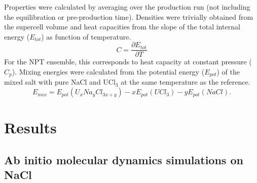 \documentclass[titlepage=firstiscover,11pt,fleqn,headheight=14pt,footheight=40.8pt]{scrreprt}
\begin{document}
Properties were calculated by averaging over the production run (not including the equilibration or pre-production time). Densities were trivially obtained from the supercell volume and heat capacities from the slope of the total internal energy ($E_{tot}$) as function of temperature. 
\begin{equation}
C=\frac{\partial E_{tot}}{\partial T}
\end{equation}
For the NPT ensemble, this corresponds to heat capacity at constant pressure ($C_p$). 
 Mixing energies were calculated from the potential energy ($E_{pot}$) of the mixed salt with pure NaCl and UCl$_3$ at the same temperature as the reference. 
\begin{equation}
E_{mix}=E_{pot}(U_xNa_yCl_{3x+y})-xE_{pot}(UCl_3)-yE_{pot}(NaCl).
\end{equation}

\section{Results}
\label{sec:results}
\subsection{Ab initio molecular dynamics simulations on NaCl}
\end{document}
